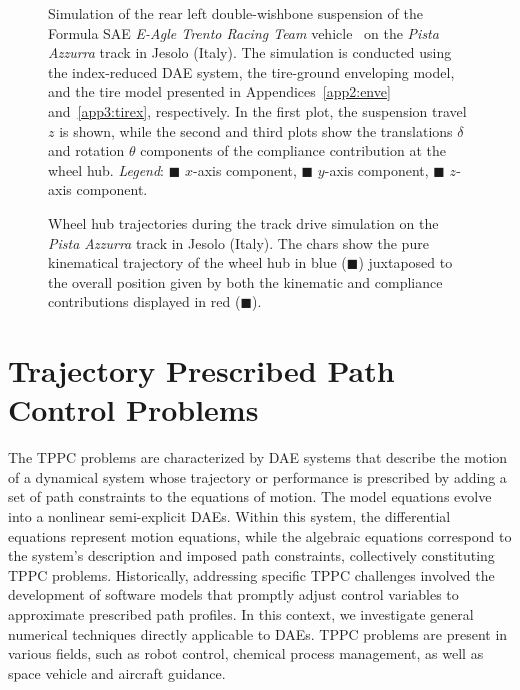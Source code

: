 \begin{figure}[htbp]
  \centering
  \small{}
  \caption{Simulation of the rear left double-wishbone suspension of the Formula SAE \textit{E-Agle Trento Racing Team} vehicle~\cite{eagle} on the \textit{Pista Azzurra} track in Jesolo (Italy). The simulation is conducted using the index-reduced \ac{DAE} system, the tire-ground enveloping model, and the tire model presented in Appendices~\ref{app2:enve} and~\ref{app3:tirex}, respectively. In the first plot, the suspension travel $z$ is shown, while the second and third plots show the translations $\delta$ and rotation $\theta$ components of the compliance contribution at the wheel hub. \emph{Legend}: {\color{mycolor1}$\blacksquare$} $x$-axis component, {\color{mycolor2}$\blacksquare$} $y$-axis component, {\color{mycolor3}$\blacksquare$} $z$-axis component.}
  \label{chap5:fig:suspension_pista_azzurra}
\end{figure}

\begin{figure}[!htp]
  \centering
  \small{}
  \caption{Wheel hub trajectories during the track drive simulation on the \emph{Pista Azzurra} track in Jesolo (Italy). The chars show the pure kinematical trajectory of the wheel hub in blue ({\color{mycolor1}$\blacksquare$}) juxtaposed to the overall position given by both the kinematic and compliance contributions displayed in red ({\color{mycolor2}$\blacksquare$}).}
  \label{chap5:fig:kine_compliance}
\end{figure}

\section{Trajectory Prescribed Path Control Problems}
\label{chap5:sec:tppc}

The \ac{TPPC} problems are characterized by \ac{DAE} systems that describe the motion of a dynamical system whose trajectory or performance is prescribed by adding a set of path constraints to the equations of motion. The model equations evolve into a nonlinear semi-explicit \acp{DAE}. Within this system, the differential equations represent motion equations, while the algebraic equations correspond to the system's description and imposed path constraints, collectively constituting \ac{TPPC} problems. Historically, addressing specific \ac{TPPC} challenges involved the development of software models that promptly adjust control variables to approximate prescribed path profiles. In this context, we investigate general numerical techniques directly applicable to \acp{DAE}. \ac{TPPC} problems are present in various fields, such as robot control, chemical process management, as well as space vehicle and aircraft guidance.

